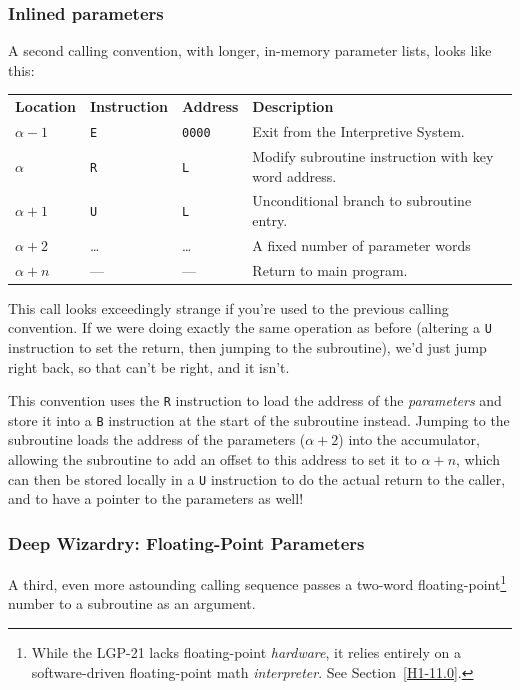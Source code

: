 \subsubsection*{Inlined parameters}
\label{subsec:standard-call2}
A second calling convention, with longer, in-memory parameter lists, looks like this:
\begin{center}
\begin{tabularx}{\textwidth}{lllX}
\textbf{Location} & \textbf{Instruction} & \textbf{Address} & \textbf{Description} \\
$\alpha - 1$      & \texttt{E}            & \texttt{0000}    & Exit from the Interpretive System. \\
$\alpha$          & \texttt{R}            & \texttt{L}       & Modify subroutine instruction with key word address. \\
$\alpha + 1$      & \texttt{U}            & \texttt{L}       & Unconditional branch to subroutine entry. \\
$\alpha + 2$      & \dots                 & \dots            & A fixed number of parameter words \\
$\alpha + n$      & ---                   & ---              & Return to main program. \\
\end{tabularx}
\end{center}
\noindent
This call looks exceedingly strange if you're used to the previous calling convention. If we were doing exactly the same operation as before (altering a \texttt{U} instruction to set the return, then jumping to the subroutine), we'd just jump right back, so that can't be right, and it isn't.

This convention uses the \texttt{R} instruction to load the address of the \emph{parameters} and store it into a \texttt{B} instruction at the start of the subroutine instead. Jumping to the subroutine loads the address of the parameters ($\alpha+2$) into the accumulator, allowing the subroutine to add an offset to this address to set it to $\alpha+n$, which can then be stored locally in a \texttt{U} instruction to do the actual return to the caller, and to have a pointer to the parameters as well!

\subsubsection*{Deep Wizardry: Floating-Point Parameters}

A third, even more astounding calling sequence passes a two-word floating-point\footnote{While the LGP-21 lacks floating-point \emph{hardware}, it relies entirely on a software-driven floating-point math \emph{interpreter}. See Section~\ref{H1-11.0}.} number to a subroutine as an argument.

